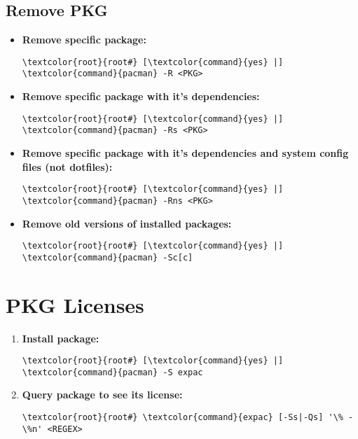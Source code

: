 \documentclass[10pt, a4paper, onecolumn, openany]{book} %
\begin{document}
\subsection{Remove PKG}
\begin{itemize}
    \item \textbf{Remove specific package:}
\begin{Verbatim}[commandchars=\\\{\}]
\textcolor{root}{root#} [\textcolor{command}{yes} |] \textcolor{command}{pacman} -R <PKG>
\end{Verbatim}
    \item \textbf{Remove specific package with it's dependencies:}
\begin{Verbatim}[commandchars=\\\{\}]
\textcolor{root}{root#} [\textcolor{command}{yes} |] \textcolor{command}{pacman} -Rs <PKG>
\end{Verbatim}
    \item \textbf{Remove specific package with it's dependencies and system config files (not dotfiles):}
\begin{Verbatim}[commandchars=\\\{\}]
\textcolor{root}{root#} [\textcolor{command}{yes} |] \textcolor{command}{pacman} -Rns <PKG>
\end{Verbatim}
    \item \textbf{Remove old versions of installed packages:}
\begin{Verbatim}[commandchars=\\\{\}]
\textcolor{root}{root#} [\textcolor{command}{yes} |] \textcolor{command}{pacman} -Sc[c]
\end{Verbatim}
\end{itemize}
\section{PKG Licenses}
\begin{enumerate}
    \item \textbf{Install package:}
\begin{Verbatim}[commandchars=\\\{\}]
\textcolor{root}{root#} [\textcolor{command}{yes} |] \textcolor{command}{pacman} -S expac
\end{Verbatim}    
    \item \textbf{Query package to see its license:}
\begin{Verbatim}[commandchars=\\\{\}]
\textcolor{root}{root#} \textcolor{command}{expac} [-Ss|-Qs] '\% - \%n' <REGEX>
\end{Verbatim}       
\end{enumerate}
\end{document}
